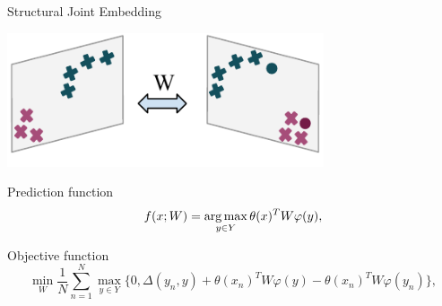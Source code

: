 \documentclass[mathserif, xcolor=table]{beamer}
\def\D{\Delta}
\def\argmax{\mathop{\rm arg\,max}\limits}%
\begin{document}


\begin{frame}{Structural Joint Embedding}
\begin{center}
\includegraphics[width=0.7\textwidth]{SJE}
\end{center}
\vspace{-4mm}
\pause

Prediction function
\begin{equation*}
f(x; W) = \argmax_{y\in Y} \theta(x)^T W \varphi(y), 
\end{equation*}
\pause

Objective function
\begin{equation*}
    \min_W \frac{1}{N} \sum_{n=1}^{N} \max_{y\in Y } \{0, \D(y_n,y) + \theta(x_n)^T W \varphi(y)-\theta(x_n)^T W \varphi(y_n)\},
\end{equation*}

\end{frame}
\end{document}
